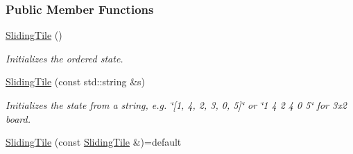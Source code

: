 \subsubsection*{Public Member Functions}
\begin{DoxyCompactItemize}
\item 
\hyperlink{structslb_1_1ext_1_1domain_1_1sliding__tile_1_1SlidingTile_ac85878baa8b325d4ad998844232eb21b}{Sliding\+Tile} ()\hypertarget{structslb_1_1ext_1_1domain_1_1sliding__tile_1_1SlidingTile_ac85878baa8b325d4ad998844232eb21b}{}\label{structslb_1_1ext_1_1domain_1_1sliding__tile_1_1SlidingTile_ac85878baa8b325d4ad998844232eb21b}

\begin{DoxyCompactList}\small\item\em Initializes the ordered state. \end{DoxyCompactList}\item 
\hyperlink{structslb_1_1ext_1_1domain_1_1sliding__tile_1_1SlidingTile_a02bdb2b08d65958650aaead1b4802d0a}{Sliding\+Tile} (const std\+::string \&s)
\begin{DoxyCompactList}\small\item\em Initializes the state from a string, e.\+g. \char`\"{}\mbox{[}1, 4, 2, 3, 0, 5\mbox{]}\char`\"{} or \char`\"{}1 4 2
4 0 5\char`\"{} for 3x2 board. \end{DoxyCompactList}\item 
\hyperlink{structslb_1_1ext_1_1domain_1_1sliding__tile_1_1SlidingTile_afe58bda56736d2f5ea35eb06121bfe32}{Sliding\+Tile} (const \hyperlink{structslb_1_1ext_1_1domain_1_1sliding__tile_1_1SlidingTile}{Sliding\+Tile} \&)=default\hypertarget{structslb_1_1ext_1_1domain_1_1sliding__tile_1_1SlidingTile_afe58bda56736d2f5ea35eb06121bfe32}{}\label{structslb_1_1ext_1_1domain_1_1sliding__tile_1_1SlidingTile_afe58bda56736d2f5ea35eb06121bfe32}


\end{DoxyCompactItemize}
